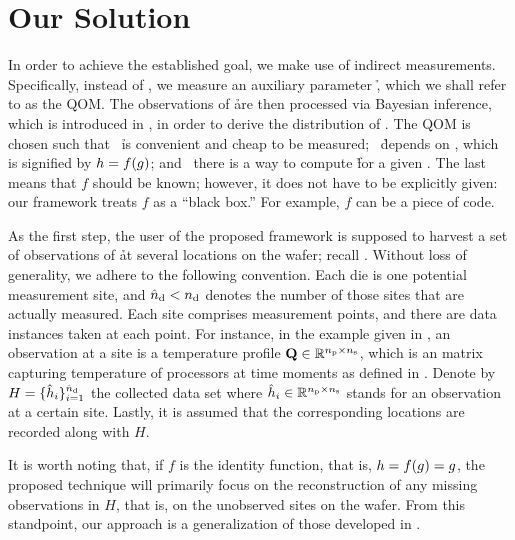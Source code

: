 \section{Our Solution}

In order to achieve the established goal, we make use of indirect measurements.
Specifically, instead of \g, we measure an auxiliary parameter \h, which we
shall refer to as the \ac{QOM}. The observations of \h are then processed via
Bayesian inference, which is introduced in , in order
to derive the distribution of \g. The \ac{QOM} is chosen such that \one~\h is
convenient and cheap to be measured; \two~\h depends on \g, which is signified
by $h = f(g)$; and \three~there is a way to compute \h for a given \g. The
last means that $f$ should be known; however, it does not have to be explicitly
given: our framework treats $f$ as a ``black box.'' For example, $f$ can be a
piece of code.

As the first step, the user of the proposed framework is supposed to harvest a
set of observations of \h at several locations on the wafer; recall
. Without loss of generality, we adhere to the following
convention. Each die is one potential measurement site, and ${\hat{n}_\mathrm{d}} < {n_\mathrm{d}}$ denotes
the number of those sites that are actually measured. Each site comprises \np
measurement points, and there are \ns data instances taken at each point. For
instance, in the example given in , an observation at a
site is a temperature profile $\mathbf{Q} \in \mathbb{R}^{{n_\mathrm{p}} \times {n_\mathrm{s}}}$, which is an
matrix capturing temperature of \np processors at \ns time moments as defined in
. Denote by $H = \{ \hat{h}_i \}_{i = 1}^{{\hat{n}_\mathrm{d}}}$ the
collected data set where $\hat{h}_i \in \mathbb{R}^{{n_\mathrm{p}} \times {n_\mathrm{s}}}$ stands for an
observation at a certain site. Lastly, it is assumed that the corresponding
locations are recorded along with $H$.

It is worth noting that, if $f$ is the identity function, that is, $h = f(g) =
g$, the proposed technique will primarily focus on the reconstruction of any
missing observations in $H$, that is, on the unobserved sites on the wafer. From
this standpoint, our approach is a generalization of those developed in
\cite{zhang2010, reda2009}.


